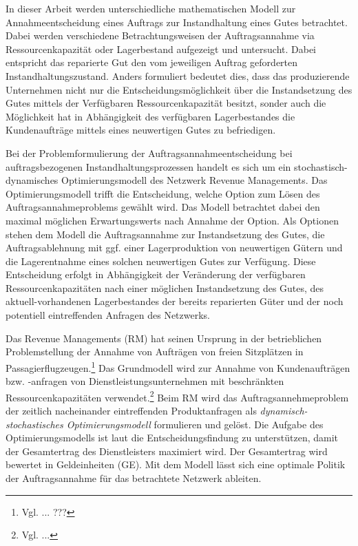 In dieser Arbeit werden unterschiedliche mathematischen Modell zur Annahmeentscheidung eines Auftrags zur Instandhaltung eines Gutes betrachtet. Dabei werden verschiedene Betrachtungsweisen der Auftragsannahme via Ressourcenkapazität oder Lagerbestand aufgezeigt und untersucht. %
Dabei entspricht das reparierte Gut den vom jeweiligen Auftrag geforderten Instandhaltungszustand. Anders formuliert bedeutet dies, dass das produzierende Unternehmen nicht nur die Entscheidungsmöglichkeit über die Instandsetzung des Gutes mittels der Verfügbaren Ressourcenkapazität besitzt, sonder auch die Möglichkeit hat in Abhängigkeit des verfügbaren Lagerbestandes die Kundenaufträge mittels eines neuwertigen Gutes zu befriedigen.

Bei der Problemformulierung der Auftragsannahmeentscheidung bei auftragsbezogenen Instandhaltungsprozessen handelt es sich um ein stochastisch-dynamisches Optimierungsmodell des Netzwerk Revenue Managements. Das Optimierungsmodell trifft die Entscheidung, welche Option zum Lösen des Auftragsannahmeproblems gewählt wird. Das Modell betrachtet dabei den maximal möglichen Erwartungswerts nach Annahme der Option. Als Optionen stehen dem Modell die Auftragsannahme zur Instandsetzung des Gutes, die Auftragsablehnung mit ggf. einer Lagerproduktion von neuwertigen Gütern und die Lagerentnahme eines solchen neuwertigen Gutes zur Verfügung. Diese Entscheidung erfolgt in Abhängigkeit der Veränderung der verfügbaren Ressourcenkapazitäten nach einer möglichen Instandsetzung des Gutes, des aktuell-vorhandenen Lagerbestandes der bereits reparierten Güter und der noch potentiell eintreffenden Anfragen des Netzwerks.

Das Revenue Managements (RM) hat seinen Ursprung in der betrieblichen Problemstellung der Annahme von Aufträgen von freien Sitzplätzen in Passagierflugzeugen.\footnote{Vgl. ... ???} Das Grundmodell wird zur Annahme von Kundenaufträgen bzw. -anfragen von Dienstleistungsunternehmen mit beschränkten Ressourcenkapazitäten verwendet.\footnote{Vgl. ...} %
Beim RM wird das Auftragsannehmeproblem der zeitlich nacheinander eintreffenden Produktanfragen als \textit{dynamisch-stochastisches Optimierungsmodell} formulieren und gelöst.
Die Aufgabe des Optimierungsmodells ist laut \cite{talluri2004theory} die Entscheidungsfindung zu unterstützen, damit der Gesamtertrag des Dienstleisters maximiert wird. Der Gesamtertrag wird bewertet in Geldeinheiten (GE). Mit dem Modell lässt sich eine optimale Politik der Auftragsannahme für das betrachtete Netzwerk ableiten.

